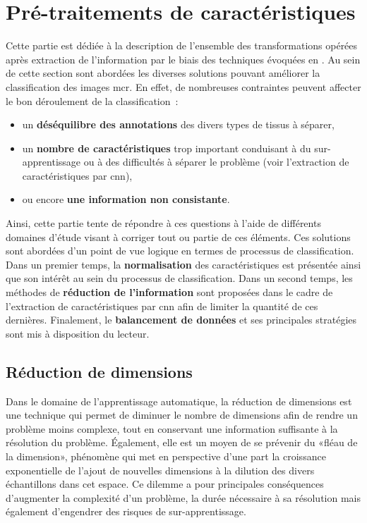 \clearpage


\section{Pré-traitements de caractéristiques}
Cette partie est dédiée à la description de l'ensemble des transformations opérées après extraction de l'information par le biais des techniques évoquées en . Au sein de cette section sont abordées les diverses solutions pouvant améliorer la classification des images \gls{mcr}. En effet, de nombreuses contraintes peuvent affecter le bon déroulement de la classification~:
\begin{itemize}
    \item un \textbf{déséquilibre des annotations} des divers types de tissus à séparer,
    \item un \textbf{nombre de caractéristiques} trop important conduisant à du sur-apprentissage ou à des difficultés à séparer le problème (voir l'extraction de caractéristiques par \gls{cnn}),
    \item ou encore \textbf{une information non consistante}.
\end{itemize}\par

Ainsi, cette partie tente de répondre à ces questions à l'aide de différents domaines d'étude visant à corriger tout ou partie de ces éléments. Ces solutions sont abordées d'un point de vue logique en termes de processus de classification. Dans un premier temps, la \textbf{normalisation} des caractéristiques est présentée ainsi que son intérêt au sein du processus de classification. Dans un second temps, les méthodes de \textbf{réduction de l'information} sont proposées dans le cadre de l'extraction de caractéristiques par \gls{cnn} afin de limiter la quantité de ces dernières. Finalement, le \textbf{balancement de données} et ses principales stratégies sont mis à disposition du lecteur.

\subsection{Réduction de dimensions}
Dans le domaine de l'apprentissage automatique, la réduction de dimensions est une technique qui permet de diminuer le nombre de dimensions afin de rendre un problème moins complexe, tout en conservant une information suffisante à la résolution du problème. Également, elle est un moyen de se prévenir du «fléau de la dimension», phénomène qui met en perspective d'une part la croissance exponentielle de l'ajout de nouvelles dimensions à la dilution des divers échantillons dans cet espace. Ce dilemme a pour principales conséquences d'augmenter la complexité d'un problème, la durée nécessaire à sa résolution mais également d'engendrer des risques de sur-apprentissage.\par

